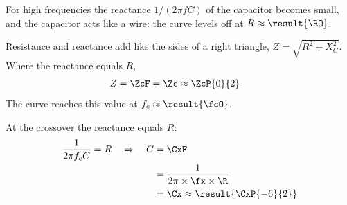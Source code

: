 \begin{abcliste}
\abc For high frequencies the reactance $1/(2\pi f C)$ of the capacitor becomes small, and the capacitor acts like a wire: the curve levels off at $R \approx \result{\RO}$.

\abc Resistance and reactance add like the sides of a right triangle, $Z = \sqrt{R^2 + X_C^2}$. Where the reactance equals $R$,
\begin{align}
 Z &= \ZcF = \Zc \approx \ZcP{0}{2}
\end{align}
The curve reaches this value at $f_c \approx \result{\fcO}$.

\abc At the crossover the reactance equals $R$:
\begin{align}
 \frac{1}{2\pi f_c C} = R \quad\Rightarrow\quad C &= \CxF \\
   &= \frac{1}{2\pi\times\fx\times\R} \\
   &= \Cx \approx \result{\CxP{-6}{2}}
\end{align}
\end{abcliste}
